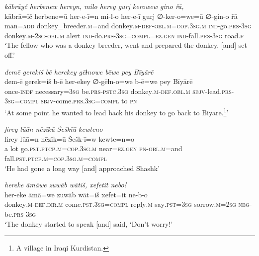 \ea \label{HB.15}
\textit{kābrāyč herbenew hereyn, milo herey gurj kerowew gino řā,} \\ 
\gll kābrā=īč herbene=ū her-e-ī=n mi-l-o her-e-ī gurj ∅-ker-o=we=ū ∅-gin-o řā \\ 
 man\textsc{=add} donkey\_breeder\textsc{.m}=and donkey\textsc{.m}\textsc{-def}\textsc{-obl}\textsc{.m}\textsc{=cop}\textsc{.3sg}\textsc{.m} \textsc{ind-}go\textsc{.prs}\textsc{-3sg} donkey\textsc{.m}-\textsc{2sg}\textsc{-obl}\textsc{.m} alert \textsc{ind-}do\textsc{.prs}\textsc{-3sg}\textsc{=\textsc{compl}}\textsc{=ez}\textsc{.gen} \textsc{ind-}fall\textsc{.prs}\textsc{-3sg} road\textsc{\textsc{.f}} \\ 
\glt `The fellow who was a donkey breeder, went and prepared the donkey, [and] set off.'
\z 
 
\ea \label{HB.25}
\textit{demē gerekiš bē herekey gēɫnowe bēwe pey Bīyārē} \\ 
\gll dem-ē gerek=iš b-ē her-ekey ∅-gēɫn-o=we b-ē=we pey Bīyārē \\ 
 once\textsc{-indf} necessary\textsc{=3sg} be\textsc{.prs}\textsc{-pstc}\textsc{.3sg} donkey\textsc{.m}\textsc{-def}\textsc{.obl}\textsc{.m} \textsc{sbjv-}lead\textsc{.prs}\textsc{-3sg}\textsc{=\textsc{compl}} \textsc{sbjv-}come\textsc{.prs}\textsc{.3sg}\textsc{=\textsc{compl}} to \textsc{pn} \\ 
\glt `At some point he wanted to lead back his donkey to go back to Biyare.\footnote{A village in Iraqi Kurdistan.}'
\z 
 
\ea \label{HB.30}
\textit{firey lūān nēzīkū Šeškīū kewteno} \\ 
\gll firey lūā=n nēzīk=ū Šešk-ī=w kewte=n=o \\ 
 a lot go\textsc{.pst}\textsc{.ptcp}\textsc{.m}\textsc{=cop}\textsc{.3sg}\textsc{.m} near\textsc{=ez}\textsc{.gen} \textsc{pn}\textsc{-obl}\textsc{.m}=and fall\textsc{.pst}\textsc{.ptcp}\textsc{.m}\textsc{=cop}\textsc{.3sg}\textsc{.m}\textsc{=\textsc{compl}} \\ 
\glt `He had gone a long way [and] approached Shashk'
\z 
 
\ea \label{HB.31}
\textit{hereke āmāwe zuwāb wātiš, xefetit nebo!} \\ 
\gll her-eke āmā=we zuwāb wāt=iš xefet=it ne-b-o \\ 
 donkey\textsc{.m}\textsc{-def}\textsc{.dir}\textsc{.m} come\textsc{.pst}\textsc{.3sg}\textsc{=compl} reply\textsc{.m} say\textsc{.pst}\textsc{=3sg} sorrow\textsc{.m}\textsc{=\textsc{2sg}} \textsc{neg-}be\textsc{.prs}\textsc{-3sg} \\ 
\glt `The donkey started to speak [and] said, ‘Don’t worry!'
\z 
 
